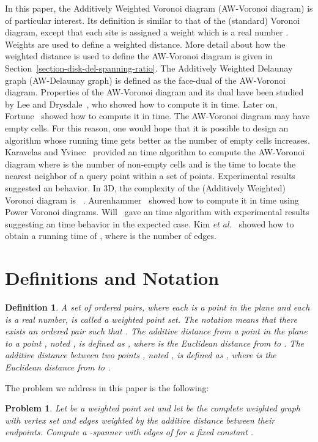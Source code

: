 \documentclass[pdftex,leqno,fleqn,12pt]{article}
\newtheorem{definition}[theorem]{Definition}
\newtheorem{problem}[theorem]{Problem}
\newcommand{\etal}{\textit{et al.}}
\begin{document}
In this paper, the Additively Weighted Voronoi diagram (AW-Voronoi diagram) is
of particular interest.
Its definition is similar to that of the (standard) Voronoi diagram, except
that each site  is assigned a weight which is a real number .
Weights are used to define a weighted distance. More detail about how the
weighted distance is used to define the AW-Voronoi diagram is given in
Section~\ref{section-disk-del-spanning-ratio}. The Additively Weighted Delaunay
graph (AW-Delaunay graph) is defined as the face-dual of the AW-Voronoi
diagram. Properties of the AW-Voronoi diagram and its dual have been studied by
Lee and Drysdale~\cite{drysdale81}, who showed how to compute it in  time. Later on, Fortune~\cite{fortune87} showed how to compute it in
 time. The AW-Voronoi diagram may have empty cells. For this
reason, one would hope that it is possible to design an algorithm whose running
time gets better as the number of empty cells increases. Karavelas and
Yvinec~\cite{karavelas02} provided an  time algorithm to
compute the AW-Voronoi diagram where  is the number of non-empty cells and
 is the time to locate the nearest neighbor of a query point within a set
of  points.  Experimental results suggested an  behavior. In 3D,
the complexity of the (Additively Weighted) Voronoi diagram is
~\cite{klee80}. Aurenhammer~\cite{aurenhammer87} showed how to
compute it in time  using Power Voronoi diagrams. Will~\cite{will98}
gave an  time algorithm with experimental results suggesting an
 time behavior in the expected case. Kim \etal~\cite{kim05}
showed how to obtain a running time of , where  is the number of
edges.



\section{Definitions and Notation}\label{section-disk-del-def}

\begin{definition}
A set  of ordered pairs, where each  is a point in the plane
and each  is a real number, is called a \emph{weighted point set}. The notation 
means that there exists an ordered pair  such that . The \emph{additive
distance} from a point  in the plane to a point , noted , is
defined as , where  is the Euclidean distance from  to . The \emph{additive distance}
between two points , noted , is defined as , where 
is the Euclidean distance from  to .
\end{definition}
The problem we address in this paper is the following:
\begin{problem} Let  be a weighted point set and let  be
the complete weighted graph with vertex set  and edges weighted
by the additive distance between their endpoints. Compute a
-spanner with  edges of  for a fixed constant .
\end{problem}
\end{document}
